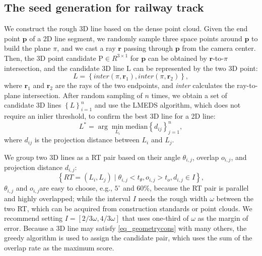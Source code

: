 \subsection{The seed generation for railway track}
We construct the rough 3D line based on the dense point cloud.
Given the end point $\mathbf p$ of a 2D line segment,
we randomly sample three space points around $\mathbf p$ to build the plane $\pi$,
and we cast a ray $\mathbf r$ passing through $\mathbf p$ from the camera center.
Then,
the 3D point candidate $\mathrm P \in R ^ {3\times1}$ for $\mathbf p$ can be obtained by $\mathbf r$-to-$\pi$ intersection,
and the candidate 3D line $\mathrm L$ can be represented by the two 3D point:
\begin{equation}
    L =\left\{\textit{inter} \left(\pi,\mathbf r_1\right),\textit{inter} \left(\pi,\mathbf r_2\right)  \right\},
\end{equation}
where $\mathbf r_1$ and $\mathbf r_2$ are the rays of the two endpoints,
and \textit{inter} calculates the ray-to-plane intersection.
After random sampling of $n$ times,
we obtain a set of candidate 3D lines $\left\{ L\right\}_{i=1}^n$ and use the LMEDS algorithm,
which does not require an inlier threshold, to confirm the best 3D line for a 2D line:
\begin{equation}
    L^* = \arg\min_{L_i} \text{median} \left\{ d_{ij}\right\}_{j=1}^n ,
\end{equation}
where $d_{ij}$ is the projection distance between $L_i$ and $L_j$.  

We group two 3D lines as a RT pair based on their angle $\theta_{i,j}$,
overlap $o_{i,j}$,
and projection distance $d_{i,j}$:
\begin{equation}
   \left\{ RT= \left(L_i, L_j\right) \mid \theta_{i,j} < t_\theta, o_{i,j} > t_o, d_{i,j} \in I  \right\},
    \label{eq_geometrycons}
\end{equation}
$\theta_{i,j}$ and $o_{i,j}$are easy to choose,
e.g.,
$5^\circ$ and 60\%,
because the RT pair is parallel and highly overlapped;
while the interval $I$ needs the rough width $\omega$ between the two RT,
which can be acquired from construction standards or point clouds.
We recommend setting $I=\left[2/3\omega,4/3\omega\right]$ that uses one-third of $\omega$ as the margin of error.
Because a 3D line may satisfy \cref{eq_geometrycons} with many others,
the greedy algorithm is used to assign the candidate pair,
which uses the sum of the overlap rate as the maximum score.

